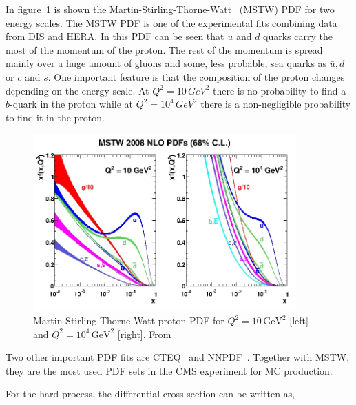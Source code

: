 In figure~\ref{fig:MSTW} is shown the Martin-Stirling-Thorne-Watt~\cite{Martin:2009iq} (MSTW) PDF for two energy scales. The MSTW PDF is one of the experimental fits combining data from DIS and HERA. In this PDF can be seen that $u$ and $d$ quarks carry the most of the momentum of the proton. The rest of the momentum is spread mainly over a huge amount of gluons and some, less probable, sea quarks as $\bar{u}, \bar{d}$ or $c$ and $s$. One important feature is that the composition of the proton changes depending on the energy scale. At $Q^{2}= 10\, GeV^{2}$ there is no probability to find a $b$-quark in the proton while at $Q^{2}= 10^{4}\, GeV^{2}$ there is a non-negligible probability to find it in the proton.

\begin{figure}[!Hhtbp]
  \begin{center}
    \includegraphics[width=0.9\textwidth]{figs/mstw2008nlo68cl_allpdfs.jpg}
    \caption{Martin-Stirling-Thorne-Watt proton PDF for $Q^{2}= 10\, \text{GeV}^{2}$ [left] and $Q^{2}= 10^{4}\, \text{GeV}^{2}$ [right]. From~\cite{Martin:2009iq}}
    \label{fig:MSTW}
  \end{center}
\end{figure}

Two other important PDF fits are CTEQ~\cite{Nadolsky:2008zw} and NNPDF~\cite{Ball:2010de}. Together with MSTW, they are the most used PDF sets in the CMS experiment for MC production. 

For the hard process, the differential cross section can be written as,

